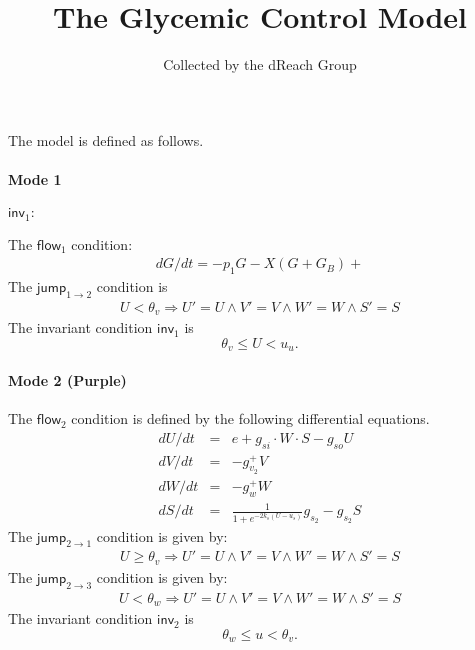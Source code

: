 \documentclass{article}
\title{The Glycemic Control Model}
\author{Collected by the dReach Group}
\newcommand{\flow}{\mathsf{flow}}
\newcommand{\jump}{\mathsf{jump}}
\newcommand{\inv}{\mathsf{inv}}
\begin{document}
\maketitle

The model is defined as follows. 

\paragraph{Mode 1}
$\inv_1:$



The $\flow_1$ condition:
\begin{eqnarray*}
dG/dt = - p_1G - X(G+G_B) + 
\end{eqnarray*}
The $\jump_{1\rightarrow 2}$ condition is
\begin{eqnarray*}
U < \theta_v \Longrightarrow U' = U \wedge V' = V \wedge W' = W \wedge S' =
S
\end{eqnarray*}
The invariant condition $\inv_1$ is
$$\theta_v \leq U < u_u.$$

\paragraph{Mode 2 (Purple)}
The $\flow_2$ condition is defined by the following differential equations.
\begin{eqnarray*}
dU/dt &=& e  + g_{si}\cdot W\cdot S -g_{so}U\\
dV/dt &=& -g_{v_2}^+ V\\
dW/dt &=& -g_w^+ W\\
dS/dt &=& \frac{1}{1+e^{-2k_s(U-u_s)}}g_{s_2} - g_{s_2}S
\end{eqnarray*}
The $\jump_{2\rightarrow 1}$ condition is given by:
\begin{eqnarray*}
U \geq \theta_v \Longrightarrow U' = U \wedge V' = V \wedge W' = W \wedge S'
= S
\end{eqnarray*}
The $\jump_{2\rightarrow 3}$ condition is given by:
\begin{eqnarray*}
U < \theta_w \Longrightarrow U' = U \wedge V' = V \wedge W' = W \wedge S'
= S
\end{eqnarray*}
The invariant condition $\inv_2$ is
$$\theta_w\leq u< \theta_v.$$
\end{document}
